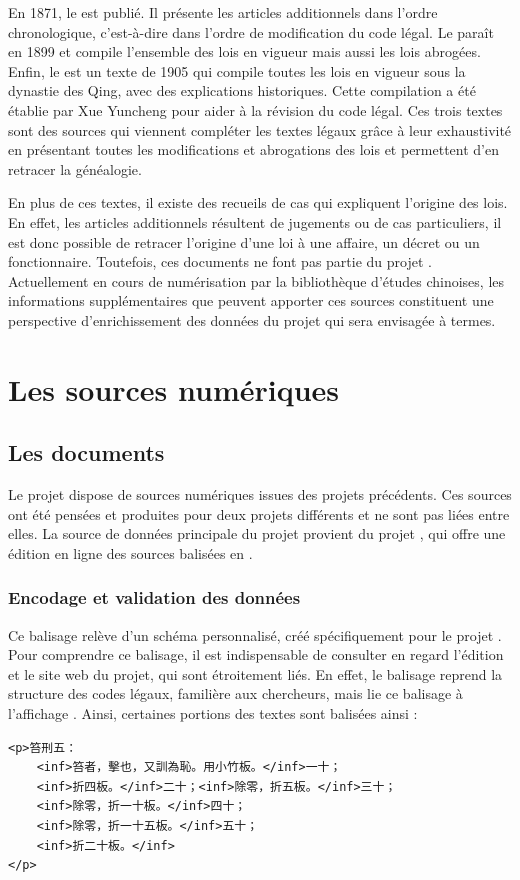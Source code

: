 En 1871, le \genyuan est publié. Il présente les articles additionnels dans l'ordre chronologique, c'est-à-dire dans l'ordre de modification du code légal. Le \huidian paraît en 1899 et compile l'ensemble des lois en vigueur mais aussi les lois abrogées. Enfin, le \dc est un texte de 1905 qui compile toutes les lois en vigueur sous la dynastie des Qing, avec des explications historiques. Cette compilation a été établie par Xue Yuncheng pour aider à la révision du code légal. Ces trois textes sont des sources qui viennent compléter les textes légaux grâce à leur exhaustivité en présentant toutes les modifications et abrogations des lois et permettent d'en retracer la généalogie.

En plus de ces textes, il existe des recueils de cas qui expliquent l'origine des lois. En effet, les articles additionnels résultent de jugements ou de cas particuliers, il est donc possible de retracer l'origine d'une loi à une affaire, un décret ou un fonctionnaire. Toutefois, ces documents ne font pas partie du projet \COREL. Actuellement en cours de numérisation par la bibliothèque d'études chinoises, les informations supplémentaires que peuvent apporter ces sources constituent une perspective d'enrichissement des données du projet qui sera envisagée à termes. 


\section{Les sources numériques}
    \subsection{Les documents \XML}
Le projet \COREL dispose de sources numériques issues des projets précédents. Ces sources ont été pensées et produites pour deux projets différents et ne sont pas liées entre elles. La source de données principale du projet provient du projet \LSC, qui offre une édition en ligne des sources balisées en \XML. 

\subsubsection{Encodage et validation des données}
Ce balisage \XML relève d'un schéma personnalisé, créé spécifiquement pour le projet \LSC. Pour comprendre ce balisage, il est indispensable de consulter en regard l'édition \XML et le site web du projet, qui sont étroitement liés. En effet, le balisage reprend la structure des codes légaux, familière aux chercheurs, mais lie ce balisage à l'affichage \HTML. Ainsi, certaines portions des textes sont balisées ainsi : 
\begin{verbatim}
<p>笞刑五：
    <inf>笞者，擊也，又訓為恥。用小竹板。</inf>一十；
    <inf>折四板。</inf>二十；<inf>除零，折五板。</inf>三十；
    <inf>除零，折一十板。</inf>四十；
    <inf>除零，折一十五板。</inf>五十；
    <inf>折二十板。</inf>
</p>
\end{verbatim}

